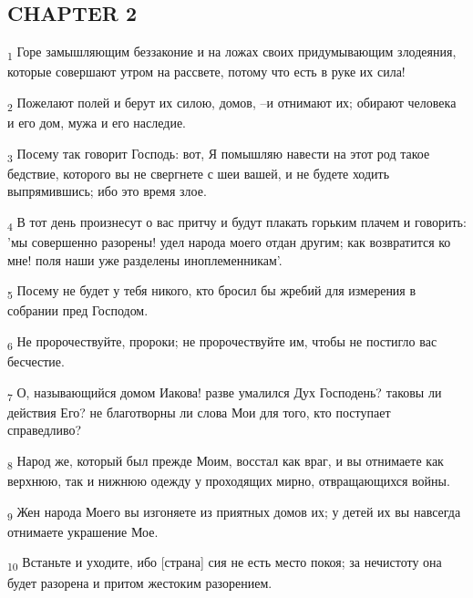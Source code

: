 \subsection{CHAPTER 2}
\begin{tcolorbox}
\textsubscript{1} Горе замышляющим беззаконие и на ложах своих придумывающим злодеяния, которые совершают утром на рассвете, потому что есть в руке их сила!
\end{tcolorbox}
\begin{tcolorbox}
\textsubscript{2} Пожелают полей и берут их силою, домов, --и отнимают их; обирают человека и его дом, мужа и его наследие.
\end{tcolorbox}
\begin{tcolorbox}
\textsubscript{3} Посему так говорит Господь: вот, Я помышляю навести на этот род такое бедствие, которого вы не свергнете с шеи вашей, и не будете ходить выпрямившись; ибо это время злое.
\end{tcolorbox}
\begin{tcolorbox}
\textsubscript{4} В тот день произнесут о вас притчу и будут плакать горьким плачем и говорить: 'мы совершенно разорены! удел народа моего отдан другим; как возвратится ко мне! поля наши уже разделены иноплеменникам'.
\end{tcolorbox}
\begin{tcolorbox}
\textsubscript{5} Посему не будет у тебя никого, кто бросил бы жребий для измерения в собрании пред Господом.
\end{tcolorbox}
\begin{tcolorbox}
\textsubscript{6} Не пророчествуйте, пророки; не пророчествуйте им, чтобы не постигло вас бесчестие.
\end{tcolorbox}
\begin{tcolorbox}
\textsubscript{7} О, называющийся домом Иакова! разве умалился Дух Господень? таковы ли действия Его? не благотворны ли слова Мои для того, кто поступает справедливо?
\end{tcolorbox}
\begin{tcolorbox}
\textsubscript{8} Народ же, который был прежде Моим, восстал как враг, и вы отнимаете как верхнюю, так и нижнюю одежду у проходящих мирно, отвращающихся войны.
\end{tcolorbox}
\begin{tcolorbox}
\textsubscript{9} Жен народа Моего вы изгоняете из приятных домов их; у детей их вы навсегда отнимаете украшение Мое.
\end{tcolorbox}
\begin{tcolorbox}
\textsubscript{10} Встаньте и уходите, ибо [страна] сия не есть место покоя; за нечистоту она будет разорена и притом жестоким разорением.
\end{tcolorbox}
